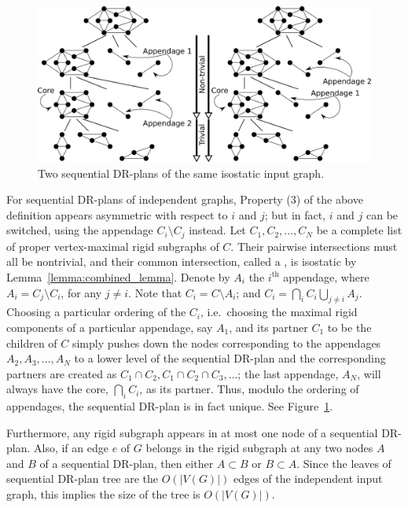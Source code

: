 \begin{figure}\centering
    \includegraphics[width=\linewidth]{../../img/svg/drp_triv_and_non}
    \caption{Two sequential DR-plans of the same isostatic input graph. }
    \label{fig:seqdrp_nonuniqueness}
\end{figure}


\begin{remark}
\label{remark:seq_is_essentially_unique}
    For sequential DR-plans of independent graphs, Property (3) of the above definition appears asymmetric with respect to $i$ and $j$; but in fact, $i$ and $j$ can be switched, using the appendage $C_i\setminus C_j$ instead. Let $C_1, C_2, \ldots, C_N$ be a complete list of proper vertex-maximal rigid subgraphs of $C$. Their pairwise intersections must all be nontrivial, and their common intersection, called a , is isostatic by Lemma~\ref{lemma:combined_lemma}. Denote by $A_i$ the $i^\text{th}$ appendage, where $A_i = C_j\setminus C_i$, for any $j\neq i$. Note that $C_i = C\setminus A_i$; and $C_i = \bigcap_i{C_i} \bigcup_{j\ne i}{A_j}$. Choosing a particular ordering of the $C_i$, i.e.\ choosing the maximal rigid components of a particular appendage, say $A_1$, and its partner $C_1$ to be the children of $C$ simply pushes down the nodes corresponding to the appendages $A_2, A_3, \ldots, A_N$ to a lower level of the sequential DR-plan and the corresponding partners are created as $C_1\cap C_2, C_1\cap C_2\cap C_3, \ldots$; the last appendage, $A_N$, will always have the core, $\bigcap_i{C_i}$, as its partner. Thus, modulo the ordering of appendages, the sequential DR-plan is in fact unique. See Figure~\ref{fig:seqdrp_nonuniqueness}.

    Furthermore, any rigid subgraph appears in at most one node of a sequential DR-plan. Also, if an edge $e$ of $G$ belongs in the rigid subgraph at any two nodes $A$ and $B$ of a sequential DR-plan, then either $A\subset B$ or $B\subset A$. Since the leaves of sequential DR-plan tree are the $O(|V(G)|)$ edges of the independent input graph, this implies the size of the tree is $O(|V(G)|)$.
\end{remark}


